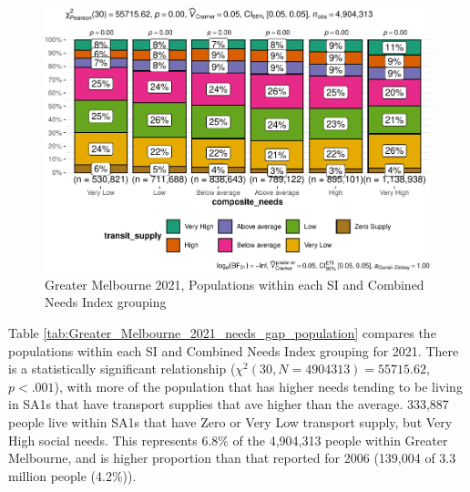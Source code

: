 \documentclass[preprint, 3p,
authoryear]{elsarticle} %
\begin{document}
\begin{figure}
\centering
\includegraphics{Leveraging_GTFS_to_assess_transit_supply_Transport_Geography_files/figure-latex/Greater_Melbourne_2021_needs_gap_population-1.pdf}
\caption{Greater Melbourne 2021, Populations within each SI and Combined
Needs Index grouping}
\end{figure}

Table \ref{tab:Greater_Melbourne_2021_needs_gap_population} compares the
populations within each SI and Combined Needs Index grouping for 2021.
There is a statistically significant relationship
(\(\chi^2(30, N = 4904313) = 55715.62\), \(p < .001\)), with more of the
population that has higher needs tending to be living in SA1s that have
transport supplies that ave higher than the average. 333,887 people live
within SA1s that have Zero or Very Low transport supply, but Very High
social needs. This represents 6.8\% of the 4,904,313 people within
Greater Melbourne, and is higher proportion than that reported for 2006
(139,004 of 3.3 million people (4.2\%)).
\end{document}
